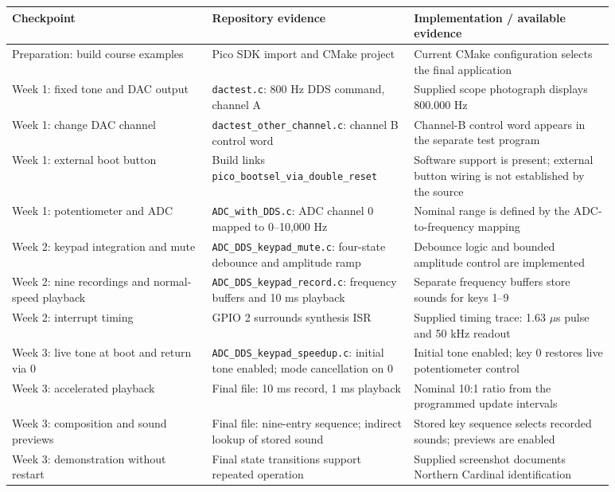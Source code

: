 \documentclass[11pt,letterpaper]{article}
\begin{document}
\begingroup\small
\setlength{\tabcolsep}{5pt}
\begin{longtable}{|>{\raggedright\arraybackslash}p{0.295\linewidth}|>{\raggedright\arraybackslash}p{0.295\linewidth}|>{\raggedright\arraybackslash}p{0.295\linewidth}|}
\hline
\textbf{Checkpoint} & \textbf{Repository evidence} & \textbf{Implementation / available evidence} \\ \hline
\endhead
Preparation: build course examples & Pico SDK import and CMake project & Current CMake configuration selects the final application \\ \hline
Week 1: fixed tone and DAC output & \texttt{dactest.c}: 800 Hz DDS command, channel A & Supplied scope photograph displays 800.000 Hz \\ \hline
Week 1: change DAC channel & \texttt{dactest\_other\_channel.c}: channel B control word & Channel-B control word appears in the separate test program \\ \hline
Week 1: external boot button & Build links \texttt{pico\_bootsel\_via\_double\_reset} & Software support is present; external button wiring is not established by the source \\ \hline
Week 1: potentiometer and ADC & \texttt{ADC\_with\_DDS.c}: ADC channel 0 mapped to 0--10,000 Hz & Nominal range is defined by the ADC-to-frequency mapping \\ \hline
Week 2: keypad integration and mute & \texttt{ADC\_DDS\_keypad\_mute.c}: four-state debounce and amplitude ramp & Debounce logic and bounded amplitude control are implemented \\ \hline
Week 2: nine recordings and normal-speed playback & \texttt{ADC\_DDS\_keypad\_record.c}: frequency buffers and 10 ms playback & Separate frequency buffers store sounds for keys 1--9 \\ \hline
Week 2: interrupt timing & GPIO 2 surrounds synthesis ISR & Supplied timing trace: 1.63 \ensuremath{\mu}s pulse and 50 kHz readout \\ \hline
Week 3: live tone at boot and return via 0 & \texttt{ADC\_DDS\_keypad\_speedup.c}: initial tone enabled; mode cancellation on 0 & Initial tone enabled; key 0 restores live potentiometer control \\ \hline
Week 3: accelerated playback & Final file: 10 ms record, 1 ms playback & Nominal 10:1 ratio from the programmed update intervals \\ \hline
Week 3: composition and sound previews & Final file: nine-entry sequence; indirect lookup of stored sound & Stored key sequence selects recorded sounds; previews are enabled \\ \hline
Week 3: demonstration without restart & Final state transitions support repeated operation & Supplied screenshot documents Northern Cardinal identification \\ \hline
\end{longtable}
\endgroup
\end{document}
